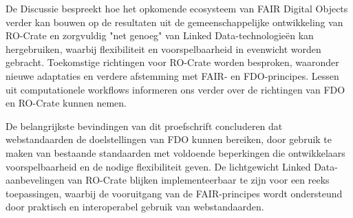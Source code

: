 \begin{small}
De Discussie bespreekt hoe het opkomende ecosysteem van FAIR Digital Objects verder kan bouwen op de resultaten uit de gemeenschappelijke ontwikkeling van RO-Crate en zorgvuldig "net genoeg" van Linked Data-technologieën kan hergebruiken, waarbij flexibiliteit en voorspelbaarheid in evenwicht worden gebracht. Toekomstige richtingen voor RO-Crate worden besproken, waaronder nieuwe adaptaties en verdere afstemming met FAIR- en FDO-principes. Lessen uit computationele workflows informeren ons verder over de richtingen van FDO en RO-Crate kunnen nemen. 

De belangrijkste bevindingen van dit proefschrift concluderen dat webstandaarden de doelstellingen van FDO kunnen bereiken, door gebruik te maken van bestaande standaarden met voldoende beperkingen die ontwikkelaars voorspelbaarheid en de nodige flexibiliteit geven. De lichtgewicht Linked Data-aanbevelingen van RO-Crate blijken implementeerbaar te zijn voor een reeks toepassingen, waarbij de vooruitgang van de FAIR-principes wordt ondersteund door praktisch en interoperabel gebruik van webstandaarden.

\end{small}
